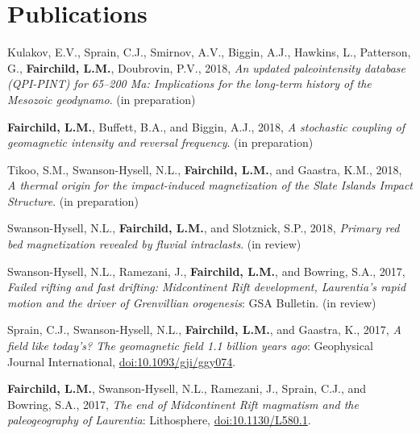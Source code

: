 \documentclass[10pt,a4paper,sans]{moderncv}
\begin{document}


\section{Publications}
\begin{etaremune}[itemsep=3pt]

 \item Kulakov, E.V., Sprain, C.J., Smirnov, A.V., Biggin, A.J.,  Hawkins, L.,
     Patterson, G., \textbf{Fairchild, L.M.}, Doubrovin, P.V., 2018, \textit{An
         updated paleointensity database (QPI-PINT) for 65--200 Ma: Implications
     for the long-term history of the Mesozoic geodynamo}. (in preparation)

 \item \textbf{Fairchild, L.M.}, Buffett, B.A., and Biggin, A.J., 2018,
 \textit{A stochastic coupling of geomagnetic intensity and reversal
  frequency}. (in preparation)

 \item{Tikoo, S.M., Swanson-Hysell, N.L., \textbf{Fairchild, L.M.}, and
             Gaastra, K.M., 2018, \textit{A thermal origin for the impact-induced
              magnetization of the Slate Islands Impact Structure}. (in preparation)}

 \item{Swanson-Hysell, N.L., \textbf{Fairchild, L.M.}, and Slotznick, S.P.,
             2018, \textit{Primary red bed magnetization revealed by fluvial
              intraclasts}. (in review)}

 \item{Swanson-Hysell, N.L., Ramezani, J., \textbf{Fairchild, L.M.}, and
             Bowring, S.A., 2017, \textit{Failed rifting and fast drifting:
              Midcontinent Rift development, Laurentia's rapid motion and the
              driver of Grenvillian orogenesis}: GSA Bulletin. (in review)}

 \item{Sprain, C.J., Swanson-Hysell, N.L., \textbf{Fairchild, L.M.}, and
             Gaastra, K., 2017, \textit{A field like today's? The geomagnetic
              field 1.1 billion years ago}: Geophysical Journal International,
             {\color{cyan}\href{https://doi.org/10.1093/gji/ggy074}
               {doi:10.1093/gji/ggy074}}.}

 \item{\textbf{Fairchild, L.M.}, Swanson-Hysell, N.L., Ramezani, J., Sprain,
             C.J., and Bowring, S.A., 2017, \textit{The end of Midcontinent Rift
              magmatism and the paleogeography of Laurentia}: Lithosphere,
             {\color{cyan}\href{https://doi.org/10.1130/L580.1}
               {doi:10.1130/L580.1}}.}


\end{etaremune}
\end{document}
